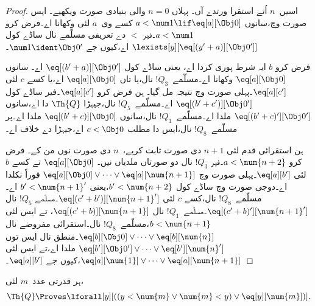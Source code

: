 \documentclass[../../../include/open-logic-section]{subfiles}
\begin{document}
\begin{proof}
اسیں~$n$ اُتے استقرا ورتدے آں۔ پہلاں $n = 0$ والی بنیادی صورت ویکھیے۔
ایس صورت وچ،سانوں $a < \num 1 \lif \eq[a][\Obj 0]$ کسے وی~$a$ لئی
وکھانا اے۔فرض کرو $a < \num 1$۔فیر $<$ دے تعریفی مسلّمے نال
ساڈے کول $\lexists[y][\eq[(y'+a)][\Obj 0']]$ اے،کیوں جے $\num 1 \ident
\Obj 0'$۔

فرض کرو $b$ ایہ شرط پوری کردا اے، یعنی ساڈے کول $\eq[(b'+a)][\Obj 0']$ اے۔
سانوں $\eq[a][\Obj 0]$ وکھانا اے۔مسلّمے~$!Q_3$ نال،یا تاں
$\eq[a][\Obj 0]$ اے،یا کسے $c$ لئی $\eq[a][c']$۔پہلی صورت وچ نتیجہ مل گیا۔ ہن فرض کرو $\eq[a][c']$۔فیر
ساڈے کول $\eq[(b' + c')][\Obj 0']$ اے۔مسلّمے~$!Q_5$ نال،جیہڑا $\Th{Q}$ دا اے،سانوں
$\eq[(b'+c)'][\Obj 0']$ ملدا اے۔مسلّمے~$!Q_1$ نال،سانوں $\eq[(b' + c)][\Obj
0]$ ملدا اے۔پر مسلّمے~$!Q_8$ نال،ایس دا مطلب $c < \Obj 0$ اے،جیہڑا
 دے خلاف اے۔

ہن استقرائی قدم لئی $n+1$ دی صورت ثابت کریے،~$n$ دی صورت نوں من کے۔ فرض کرو $a < \num {n+2}$۔فیر $!Q_3$ نال دو صورتاں ملدیاں نیں۔ $\eq[a][\Obj 0]$ تے کسے $b$ لئی
$\eq[a][b']$۔پہلی صورت وچ $\eq[a][\Obj 0] \lor \dots \lor
\eq[a][\num{n+1}]$ فوراً نکلدا اے۔دوجی صورت وچ ساڈے کول $b'
< \num {n+2}$،یعنی $b' < \num{n+1}'$ اے۔مسلّمے~$!Q_8$ نال،کسے $c$ لئی
$\eq[(c'+b')][\num{n+1}']$۔مسلّمے $!Q_5$ نال
$\eq[(c'+b)'][\num{n+1}']$۔مسلّمے~$!Q_1$ نال $\eq[(c'+b)][\num{n+1}]$،
تے ایس لئی $b < \num{n+1}$،مسلّمے~$!Q_8$ نال۔استقرائی مفروضے نال
$\eq[b][\Obj 0] \lor \dots \lor \eq[b][\num{n}]$۔منطق نال ایس توں
$\eq[b'][\Obj 0'] \lor \dots \lor \eq[b'][\num{n}']$ ملدا اے،تے ایس لئی
$\eq[a][\num{1}] \lor \dots \lor \eq[a][\num{n+1}]$،کیوں جے
$\eq[a][b']$۔
\end{proof}

\begin{lem}
   ہر قدرتی عدد~$m$ لئی،
  \[
  \Th{Q} \Proves
  \lforall[y][((y < \num{m} \lor \num{m} < y) \lor \eq[y][\num{m}])].
  \]
\end{lem}
\end{document}
